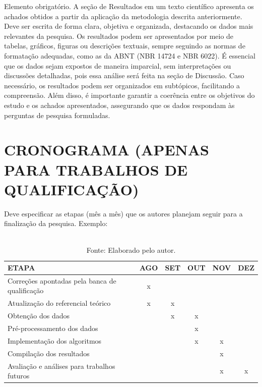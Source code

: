 \documentclass[
	article,             %
	12pt,                %
	oneside,             %
	a4paper,             %
	english,             %
	brazil,              %
	sumario=tradicional
]{abntex2}
\begin{document}
Elemento obrigatório. A seção de Resultados em um texto científico apresenta os achados obtidos a partir da aplicação da metodologia descrita anteriormente. Deve ser escrita de forma clara, objetiva e organizada, destacando os dados mais relevantes da pesquisa. Os resultados podem ser apresentados por meio de tabelas, gráficos, figuras ou descrições textuais, sempre seguindo as normas de formatação adequadas, como as da ABNT (NBR 14724 e NBR 6022). É essencial que os dados sejam expostos de maneira imparcial, sem interpretações ou discussões detalhadas, pois essa análise será feita na seção de Discussão. Caso necessário, os resultados podem ser organizados em subtópicos, facilitando a compreensão. Além disso, é importante garantir a coerência entre os objetivos do estudo e os achados apresentados, assegurando que os dados respondam às perguntas de pesquisa formuladas.

\section{\textbf{CRONOGRAMA (APENAS PARA TRABALHOS DE QUALIFICAÇÃO)}}

Deve especificar as etapas (mês a mês) que os autores planejam seguir para a finalização da pesquisa. Exemplo:

\begin{table}[ht]
	\centering
	\caption{Cronograma proposto para continuidade da pesquisa.}
	\begin{tabular}{l c c c c c} %
		\toprule
		ETAPA & AGO & SET & OUT & NOV & DEZ \\ 
		\midrule
		Correções apontadas pela banca de qualificação & x &   &   &   &   \\ 
		Atualização do referencial teórico             & x & x &   &   &   \\ 
		Obtenção dos dados                             &   & x & x &   &   \\ 
		Pré-processamento dos dados                    &   &   & x &   &   \\ 
		Implementação dos algoritmos                   &   &   & x & x &   \\ 
		Compilação dos resultados                      &   &   &   & x &   \\ 
		Avaliação e análises para trabalhos futuros    &   &   &   & x & x \\ 
		\bottomrule
	\end{tabular}
	\caption*{\\Fonte: Elaborado pelo autor.}
	\label{tab:cronograma}
\end{table}
\end{document}
